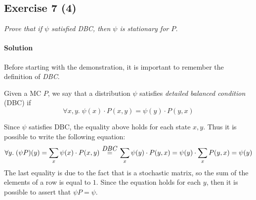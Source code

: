 \subsection*{Exercise 7 (4)}
\textit{Prove that if $ \psi $ satisfied DBC, then $ \psi $ is stationary for $ P $.}

\paragraph{Solution}
Before starting with the demonstration, it is important to remember the definition of \textit{DBC}.
\begin{definition}
    \normalfont Given a MC $P$, we say that a distribution $\psi$ satisfies \textit{detailed balanced condition} (DBC) if
    \[ \forall x, y.\;\psi(x) \cdot P(x, y) = \psi(y) \cdot P(y, x) \]
\end{definition} 
Since $\psi$ satisfies DBC, the equality above holds for each state $x, y$. Thus it is possible to write the following equation:
\[ 
    \forall y.\;(\psi P)(y) = \sum_{x} \psi(x) \cdot P(x, y)\;\;\;\fordbc\;\;\;\sum_{x} \psi(y) \cdot P(y, x) = 
    \psi(y) \cdot \sum_{x} P(y, x) = \psi(y)
\]
The last equality is due to the fact that is a stochastic matrix, so the sum of the elements of a row is equal to $1$.
Since the equation holds for each $y$, then it is possible to assert that $\psi P = \psi$.